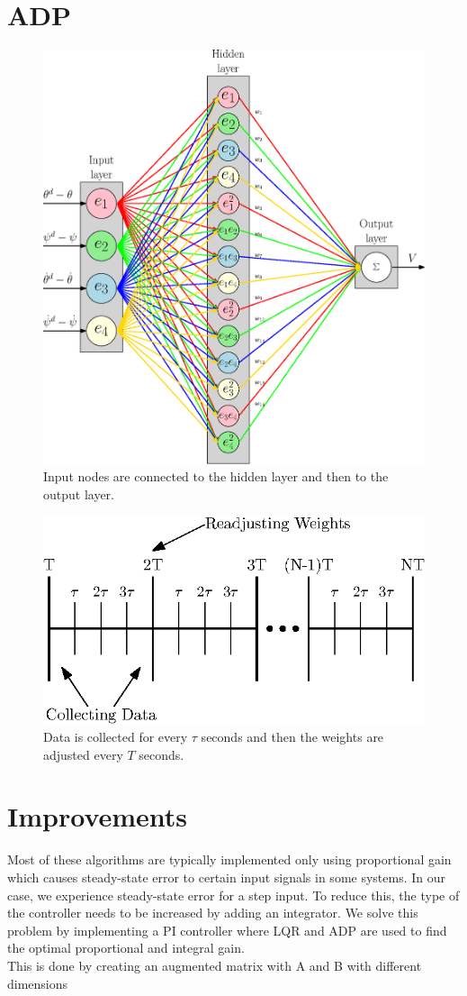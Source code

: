 \section{ADP}

\begin{figure}[!htbp]
    \centering
    \includegraphics[width=.46\textwidth,keepaspectratio=true]{figs/ipe/ADP_Neural_Network.eps}
    \caption{Input nodes are connected to the hidden layer and then to the output layer.}
    \label{fig:ADP_Neural_Network}
\end{figure}
\begin{figure}[!htbp]
    \centering
    \includegraphics[width=.46\textwidth,keepaspectratio=true]{figs/ipe/ADP_Samples.eps}
    \caption{Data is collected for every $\tau$ seconds and then the weights are adjusted every $T$ seconds.}
    \label{fig:ADP_Samples}
\end{figure}

\section{Improvements}
Most of these algorithms are typically implemented only using proportional gain which causes steady-state error to certain input signals in some systems.  In our case, we experience steady-state error for a step input.  To reduce this, the type of the controller needs to be increased by adding an integrator.  We solve this problem by implementing a PI controller where LQR and ADP are used to find the optimal proportional and integral gain.\\
This is done by creating an augmented matrix with A and B with different dimensions




